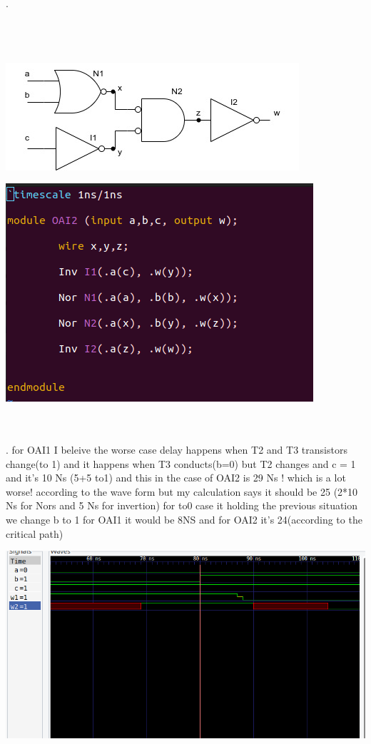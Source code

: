 \\\;
\\.
\\\;
\\\;
\\\;
\\\;
\begin{landscape}
\vspace*{3cm}
\hspace*{-1cm}\includegraphics[width = 0.5 \linewidth]{OAI2.jpg}
\hspace*{-2cm}
\end{landscape}

\begin{landscape}
\vspace*{-5.5cm}
\hspace*{7.5cm}\includegraphics[width = 0.5 \linewidth]{OAI2.png}
\hspace*{2cm}
\end{landscape}
																	
\\\;
\\. for OAI1 I beleive the worse case delay happens when T2 and T3 transistors change(to 1) and it happens when T3 conducts(b=0) but T2 changes and c = 1 and it's 10 Ns (5+5 to1) and this in the case of OAI2 is 29 Ns ! which is a lot worse! according to the wave form 
but my calculation says it should be 25 (2*10 Ns for Nors and 5 Ns for invertion)
for to0 case it holding the previous situation we change b to 1 
for OAI1 it would be 8NS
and for OAI2 it's 24(according to the critical path)
 
\begin{landscape}
\vspace*{3cm}
\hspace*{-1cm}\includegraphics[width = 0.5 \linewidth]{wave3.png}
\hspace*{-2cm}
\end{landscape}


